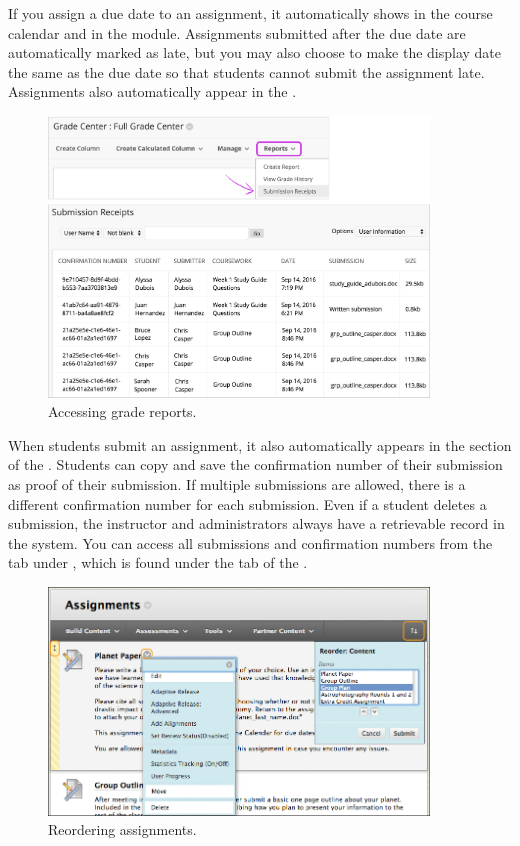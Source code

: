If you assign a due date to an assignment, it automatically shows in the course calendar and in the  module. Assignments submitted after the due date are automatically marked as late, but you may also choose to make the display date the same as the due date so that students cannot submit the assignment late. Assignments also automatically appear in the .

	\begin{figure}[!ht]
	\centering
	\includegraphics[width=0.9\textwidth]{sections/blackboard/images/original_submission_receipts_grade_center.png}
	\caption{Accessing grade reports.}
	\end{figure}

When students submit an assignment, it also automatically appears in the  section of the . Students can copy and save the confirmation number of their submission as proof of their submission. If multiple submissions are allowed, there is a different confirmation number for each submission. Even if a student deletes a submission, the instructor and administrators always have a retrievable record in the system. You can access all submissions and confirmation numbers from the  tab under , which is found under the  tab of the .

	\begin{figure}[!ht]
	\centering
	\includegraphics[width=0.9\textwidth]{sections/blackboard/images/edit_assignments_original.png}
	\caption{Reordering assignments.}
	\end{figure}

